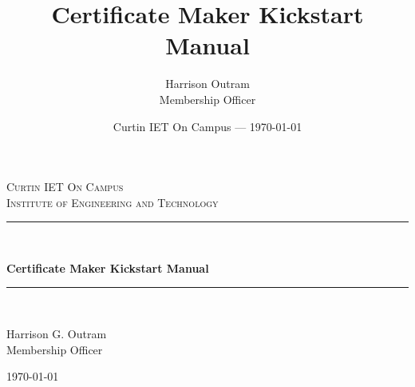 \documentclass[11pt]{article}
\title{Certificate Maker Kickstart Manual} %
\author{Harrison Outram\\ Membership Officer}
\date{Curtin IET On Campus --- \today} %
\begin{document}

\begin{titlepage} %
    \newcommand{\HRule}{\rule{\linewidth}{0.5mm}} %
    
    \center %
    
    
    \textsc{\LARGE Curtin IET On Campus}\\[1.5cm] %
    
    \textsc{\LARGE Institute of Engineering and Technology}\\[0.5cm] %
    
    
    \HRule\\[0.4cm]

    \vspace{0.4cm}
    
    {\Huge\bfseries Certificate Maker Kickstart Manual}\\[0.4cm] %
    
    \HRule\\[1.5cm]
    
    
    \begin{center}
        \large
        Harrison G. Outram \\
        Membership Officer
    \end{center}
    
    
    \vfill\vfill\vfill %
    
    {\Large\today} %
    

\end{titlepage}
\end{document}
